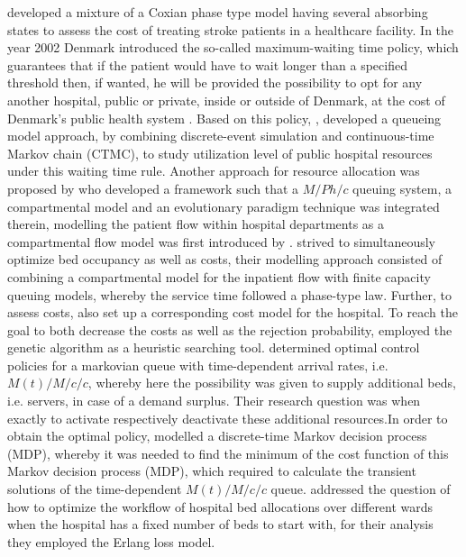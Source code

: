 \documentclass[11pt,a4paper]{article}
\begin{document}
\begin{spacing}{1.8}
\citet{Gillespie2011} developed a mixture of a Coxian phase type model having several absorbing states to assess the cost of treating stroke patients in a healthcare facility. 
In the year 2002 Denmark introduced the so-called maximum-waiting time policy, which guarantees that if the patient would have to wait longer than a specified threshold then, if wanted, he will be provided the possibility to opt for any another hospital, public or private, inside or outside of Denmark,  at the cost of Denmark's public health system \citep{OECD}. Based on this policy, 
 \citet{Kozlowski2015},  developed a queueing model approach, by combining discrete-event simulation and continuous-time Markov chain (CTMC), to study utilization level of public hospital resources under this waiting time rule. Another approach for resource allocation was proposed by \citep{Belciug2015} who developed a framework such that a  \(M/Ph/c\) queuing system, a compartmental model and an evolutionary paradigm technique was integrated therein, modelling the patient flow within  hospital departments as a compartmental flow model was first introduced by \citep{Harrison1991}. %
 \citet{Belciug2016} strived to simultaneously optimize bed occupancy as well as costs, their modelling approach consisted of combining a compartmental model for the inpatient flow with finite capacity queuing models, whereby the service time followed a phase-type law. Further, to assess costs,  \citet{Belciug2016} also set up a corresponding cost model for the hospital. To reach the goal to both decrease the costs as well as the rejection probability, \citet{Belciug2016} employed the genetic algorithm as a heuristic searching tool. 
 \citet{Tirdad2016} determined optimal control policies for a markovian queue with time-dependent arrival rates, i.e. \(M(t)/M/c/c\),  whereby here the possibility was given to supply additional beds, i.e. servers,  in case of a demand surplus. Their  \citep{Tirdad2016} research question was when exactly to activate respectively deactivate these additional resources.In order to obtain the optimal policy,  \citet{Tirdad2016} modelled a discrete-time Markov decision process (MDP), whereby it was needed to find the minimum of the cost function of this Markov decision process (MDP), which required to calculate the transient solutions of the time-dependent \(M(t)/M/c/c\) queue. 
 \citet{Bekker2016} addressed the question of how to optimize the workflow of hospital bed allocations over different wards when the hospital has a fixed number of beds to start with, for their analysis they employed the Erlang loss model. 

\end{spacing}
\end{document}
